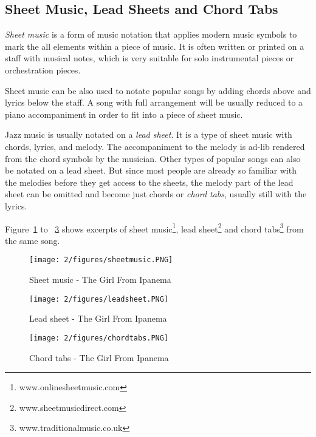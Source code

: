 \subsection{Sheet Music, Lead Sheets and Chord Tabs}
{\it Sheet music} is a form of music notation that applies modern music symbols to mark the all elements within a piece of music. It is often written or printed on a staff with musical notes, which is very suitable for solo instrumental pieces or orchestration pieces.

Sheet music can be also used to notate popular songs by adding chords above and lyrics below the staff. A song with full arrangement will be usually reduced to a piano accompaniment in order to fit into a piece of sheet music.

Jazz music is usually notated on a {\it lead sheet}. It is a type of sheet music with chords, lyrics, and melody. The accompaniment to the melody is ad-lib rendered from the chord symbols by the musician. Other types of popular songs can also be notated on a lead sheet. But since most people are already so familiar with the melodies before they get access to the sheets, the melody part of the lead sheet can be omitted and become just chords or {\it chord tabs}, usually still with the lyrics.

Figure~\ref{fig:2-sheetmusic} to ~\ref{fig:2-chordtabs} shows excerpts of sheet music\footnote{www.onlinesheetmusic.com}, lead sheet\footnote{www.sheetmusicdirect.com} and chord tabs\footnote{www.traditionalmusic.co.uk} from the same song.

\begin{figure}[htb]
\centering
\texttt{[image: 2/figures/sheetmusic.PNG]}
\caption{Sheet music - The Girl From Ipanema}
\label{fig:2-sheetmusic}
\end{figure}

\begin{figure}[htb]
\centering
\texttt{[image: 2/figures/leadsheet.PNG]}
\caption{Lead sheet - The Girl From Ipanema}
\label{fig:2-leadsheet}
\end{figure}

\begin{figure}[htb]
\centering
\texttt{[image: 2/figures/chordtabs.PNG]}
\caption{Chord tabs - The Girl From Ipanema}
\label{fig:2-chordtabs}
\end{figure}

\newpage
